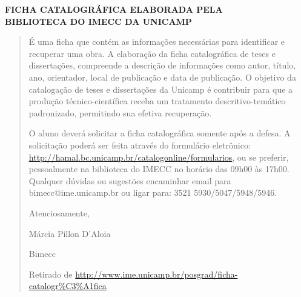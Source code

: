 \begin{center}
    {\Large \textbf{FICHA CATALOGR\'AFICA ELABORADA PELA\\ BIBLIOTECA DO IMECC
    DA UNICAMP}
    }
\end{center}

\begin{quote}
    É uma ficha que contém as informações necessárias para identificar e
    recuperar uma obra.
    A elaboração da ficha catalográfica de teses e dissertações,
    compreende a descrição de informações como autor, título, ano,
    orientador, local de publicação e data de publicação.
    O objetivo da catalogação de teses e dissertações da Unicamp é
    contribuir para que a produção técnico-científica receba um
    tratamento descritivo-temático padronizado, permitindo sua efetiva
    recuperação.

    O aluno deverá solicitar a ficha catalográfica somente após a
    defesa.  A solicitação poderá ser feita através do formulário
    eletrônico:
    \url{http://hamal.bc.unicamp.br/catalogonline/formularios}, ou se preferir,  pessoalmente na
    biblioteca do IMECC no horário das 09h00 às 17h00.
    Qualquer dúvidas  ou sugestões encaminhar email para
    bimecc@ime.unicamp.br ou ligar para: 3521 5930/5047/5948/5946.

    Atenciosamente,

    Márcia Pillon D'Aloia

    Bimecc

    Retirado de
    \url{http://www.ime.unicamp.br/posgrad/ficha-catalogr%C3%A1fica}
\end{quote}
